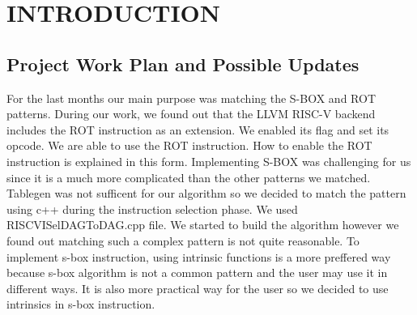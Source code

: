 \chapter{INTRODUCTION}\label{Ch1}


\section{Project Work Plan and Possible Updates}\label{plan}


For the last months our main purpose was matching the S-BOX and ROT patterns. During our work, we found out that the LLVM RISC-V backend includes the ROT instruction as an extension. We enabled its flag and set its opcode. We are able to use the ROT instruction. How to enable the ROT instruction is explained in this form. Implementing S-BOX was challenging for us since it is a much more complicated than the other patterns we matched. Tablegen was not sufficent for our algorithm so we decided to match the pattern using c++ during the instruction selection phase. We used RISCVISelDAGToDAG.cpp file. We started to build the algorithm however we found out matching such a complex pattern is not quite reasonable. To implement s-box instruction, using intrinsic functions is a more preffered way because s-box algorithm is not a common pattern and the user may use it in different ways. It is also more practical way for the user so we decided to use intrinsics in s-box instruction. 


